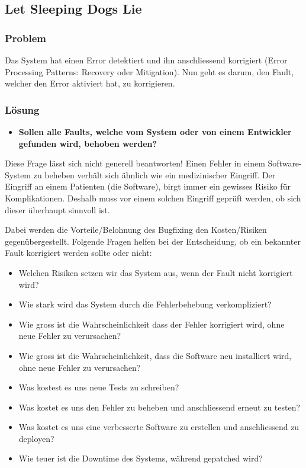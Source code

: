 \subsection{Let Sleeping Dogs Lie}


\subsubsection*{Problem}


Das System hat einen Error detektiert und ihn anschliessend korrigiert (Error Processing Patterns: Recovery oder Mitigation). Nun geht es darum, den Fault, welcher den Error aktiviert hat, zu korrigieren.

\subsubsection*{Lösung}


\begin{itemize}
	\item \textbf{Sollen alle Faults, welche vom System oder von einem Entwickler gefunden wird, behoben werden?}
\end{itemize}

Diese Frage lässt sich nicht generell beantworten! Einen Fehler in einem Software-System zu beheben verhält sich ähnlich wie ein medizinischer Eingriff. Der Eingriff an einem Patienten (die Software), birgt immer ein gewisses Risiko für Komplikationen. Deshalb muss vor einem solchen Eingriff geprüft werden, ob sich dieser überhaupt sinnvoll ist.

Dabei werden die Vorteile/Belohnung des Bugfixing den Kosten/Risiken gegenübergestellt. Folgende Fragen helfen bei der Entscheidung, ob ein bekannter Fault korrigiert werden sollte oder nicht:

\begin{itemize}
	\item Welchen Risiken setzen wir das System aus, wenn der Fault nicht korrigiert wird?
	\item Wie stark wird das System durch die Fehlerbehebung verkompliziert?
	\item Wie gross ist die Wahrscheinlichkeit dass der Fehler korrigiert wird, ohne neue Fehler zu verursachen?
	\item Wie gross ist die Wahrscheinlichkeit, dass die Software neu installiert wird, ohne neue Fehler zu verursachen?
	\item Was kostest es uns neue Tests zu schreiben?
	\item Was kostet es uns den Fehler zu beheben und anschliessend erneut zu testen?
	\item Was kostet es uns eine verbesserte Software zu erstellen und anschliessend zu deployen?
	\item Wie teuer ist die Downtime des Systems, während gepatched wird?
\end{itemize}

